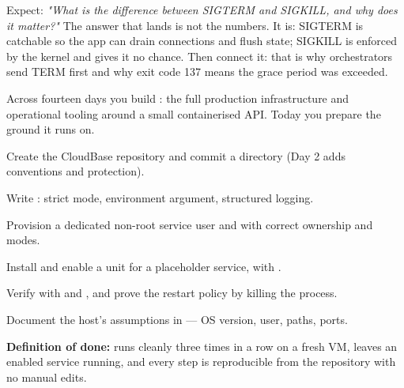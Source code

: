 \begin{interview}
Expect: \emph{"What is the difference between SIGTERM and SIGKILL, and why does it matter?"} The answer that lands is not the numbers. It is: SIGTERM is catchable so the app can drain connections and flush state; SIGKILL is enforced by the kernel and gives it no chance. Then connect it: that is why orchestrators send TERM first and why exit code 137 means the grace period was exceeded.
\end{interview}


Across fourteen days you build : the full production infrastructure and operational tooling around a small containerised API. Today you prepare the ground it runs on.

\begin{buildalong}
\begin{wbitem}
  \item Create the CloudBase repository and commit a  directory (Day 2 adds conventions and protection).
  \item Write : strict mode, environment argument, structured logging.
  \item Provision a dedicated non-root service user and  with correct ownership and modes.
  \item Install and enable a  unit for a placeholder service, with .
  \item Verify with  and , and prove the restart policy by killing the process.
  \item Document the host's assumptions in  --- OS version, user, paths, ports.
\end{wbitem}
\smallskip\textbf{Definition of done:}  runs cleanly three times in a row on a fresh VM, leaves an enabled service running, and every step is reproducible from the repository with no manual edits.
\end{buildalong}


